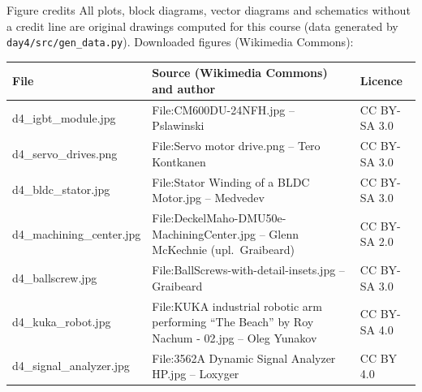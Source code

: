 \documentclass[aspectratio=169,10pt]{beamer}
\begin{document}
\begin{frame}[t]{Figure credits}
\scriptsize
All plots, block diagrams, vector diagrams and schematics without a credit line are original drawings computed for this course
(data generated by \texttt{day4/src/gen\_data.py}). Downloaded figures (Wikimedia Commons):\\[2mm]
\begin{tabularx}{\linewidth}{@{}l X l@{}}
\toprule
\textbf{File} & \textbf{Source (Wikimedia Commons) and author} & \textbf{Licence}\\
\midrule
d4\_igbt\_module.jpg & File:CM600DU-24NFH.jpg -- Pslawinski & CC BY-SA 3.0\\
d4\_servo\_drives.png & File:Servo motor drive.png -- Tero Kontkanen & CC BY-SA 3.0\\
d4\_bldc\_stator.jpg & File:Stator Winding of a BLDC Motor.jpg -- Medvedev & CC BY-SA 3.0\\
d4\_machining\_center.jpg & File:DeckelMaho-DMU50e-MachiningCenter.jpg -- Glenn McKechnie (upl.\ Graibeard) & CC BY-SA 2.0\\
d4\_ballscrew.jpg & File:BallScrews-with-detail-insets.jpg -- Graibeard & CC BY-SA 3.0\\
d4\_kuka\_robot.jpg & File:KUKA industrial robotic arm performing ``The Beach'' by Roy Nachum - 02.jpg -- Oleg Yunakov & CC BY-SA 4.0\\
d4\_signal\_analyzer.jpg & File:3562A Dynamic Signal Analyzer HP.jpg -- Loxyger & CC BY 4.0\\
\bottomrule
\end{tabularx}
\end{frame}
\end{document}
